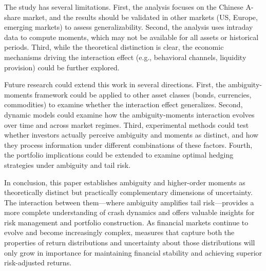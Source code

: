 \documentclass[preprint,12pt,authoryear]{elsarticle}
\begin{document}
The study has several limitations. First, the analysis focuses on the Chinese A-share market, and the results should be validated in other markets (US, Europe, emerging markets) to assess generalizability. Second, the analysis uses intraday data to compute moments, which may not be available for all assets or historical periods. Third, while the theoretical distinction is clear, the economic mechanisms driving the interaction effect (e.g., behavioral channels, liquidity provision) could be further explored.

Future research could extend this work in several directions. First, the ambiguity-moments framework could be applied to other asset classes (bonds, currencies, commodities) to examine whether the interaction effect generalizes. Second, dynamic models could examine how the ambiguity-moments interaction evolves over time and across market regimes. Third, experimental methods could test whether investors actually perceive ambiguity and moments as distinct, and how they process information under different combinations of these factors. Fourth, the portfolio implications could be extended to examine optimal hedging strategies under ambiguity and tail risk.

In conclusion, this paper establishes ambiguity and higher-order moments as theoretically distinct but practically complementary dimensions of uncertainty. The interaction between them—where ambiguity amplifies tail risk—provides a more complete understanding of crash dynamics and offers valuable insights for risk management and portfolio construction. As financial markets continue to evolve and become increasingly complex, measures that capture both the properties of return distributions and uncertainty about those distributions will only grow in importance for maintaining financial stability and achieving superior risk-adjusted returns.



\end{document}
